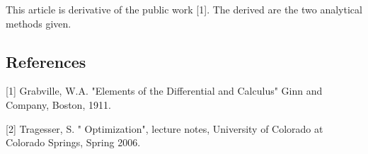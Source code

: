 \documentclass[12pt]{article}
\begin{document}
This article is derivative of the public  work [1].  The  derived are the two analytical methods given.

\subsection{References}

[1] Grabville, W.A.  "Elements of the Differential and  Calculus"  Ginn and Company, Boston, 1911.

[2] Tragesser, S. " Optimization", lecture notes, University of Colorado at Colorado Springs, Spring 2006.
\end{document}
